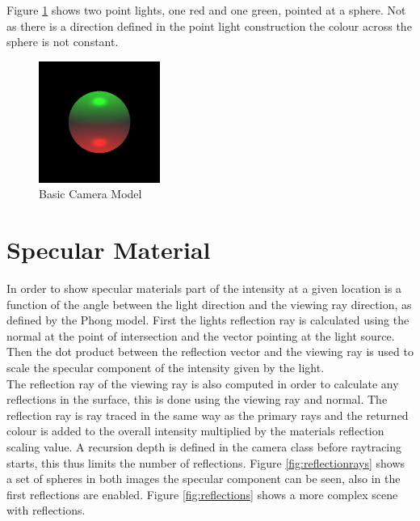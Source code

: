 \documentclass{article}
\begin{document}
Figure \ref{fig:pointligh} shows two point lights, one red and one green,
pointed at a sphere. Not as there is a direction defined in the point light
construction the colour across the sphere is not constant.\\

\begin{figure}[H]
  \begin{center}
  \includegraphics[width=150px]{Images/pointLight.png}
  \caption{Basic Camera Model}
  \label{fig:pointligh}
  \end{center}
\end{figure}

\section{Specular Material}

In order to show specular materials part of the intensity at a given location is
a function of the angle between the light direction and the viewing ray direction,
as defined by the Phong model. First the lights reflection ray is calculated using the
normal at the point of intersection and the vector pointing at the light source. Then
the dot product between the reflection vector and the viewing ray is used to scale the
specular component of the intensity given by the light.\\

The reflection ray of the viewing ray is also computed in order to calculate any
reflections in the surface, this is done using the viewing ray and normal.
The reflection ray is ray traced in the same way as the
primary rays and the returned colour is added to the overall intensity multiplied
by the materials reflection scaling value. A recursion depth is defined in the
camera class before raytracing starts, this thus limits the number of reflections.
Figure \ref{fig:reflectionrays} shows a set of spheres in both images the specular
component can be seen, also in the first reflections are enabled. Figure \ref{fig:reflections}
shows a more complex scene with reflections.
\end{document}
